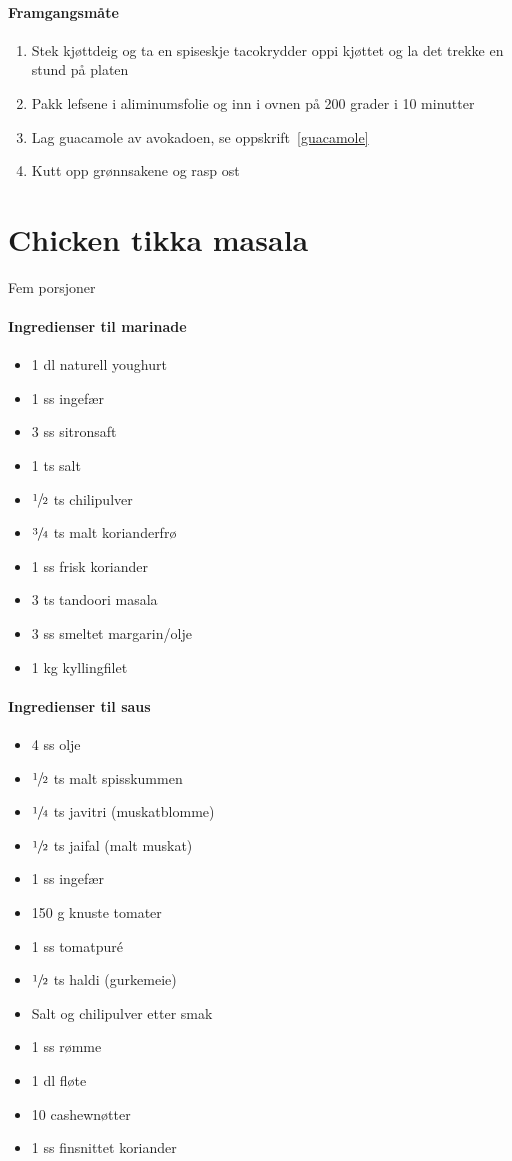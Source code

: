 \documentclass[12pt,a4paper]{book}
\begin{document}
\paragraph{Framgangsmåte}
\begin{enumerate}[noitemsep]
	\item Stek kjøttdeig og ta en spiseskje tacokrydder oppi kjøttet og la det trekke en stund på platen
	\item Pakk lefsene i aliminumsfolie og inn i ovnen på 200 grader i 10 minutter
	\item Lag guacamole av avokadoen, se oppskrift~\ref{guacamole}
	\item Kutt opp grønnsakene og rasp ost
\end{enumerate}
\clearpage{}
\clearpage{}\section{﻿Chicken tikka masala}
Fem porsjoner

\paragraph{Ingredienser til marinade}
\begin{itemize}[noitemsep]
	\item 1 dl naturell youghurt
	\item 1 ss ingefær
	\item 3 ss sitronsaft
	\item 1 ts salt
	\item $\sfrac{1}{2}$ ts chilipulver
	\item $\sfrac{3}{4}$ ts malt korianderfrø
	\item 1 ss frisk koriander
	\item 3 ts tandoori masala
	\item 3 ss smeltet margarin/olje
	\item 1 kg kyllingfilet
\end{itemize}

\paragraph{Ingredienser til saus}
\begin{itemize}[noitemsep]
	\item 4 ss olje
	\item  $\sfrac{1}{2}$ ts malt spisskummen
	\item $\sfrac{1}{4}$ ts javitri (muskatblomme)
	\item  $\sfrac{1}{2}$ ts jaifal (malt muskat)
	\item 1 ss ingefær
	\item 150 g knuste tomater
	\item 1 ss tomatpuré
	\item  $\sfrac{1}{2}$ ts haldi (gurkemeie)
	\item Salt og chilipulver etter smak
	\item 1 ss rømme
	\item 1 dl fløte
	\item 10 cashewnøtter
	\item 1 ss finsnittet koriander
\end{itemize}
\end{document}
